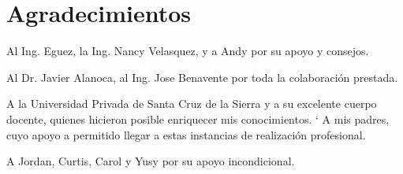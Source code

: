 \chapter*{Agradecimientos}
\thispagestyle{empty}

\begin{center}
        \vspace{0.3cm}

Al Ing. Eguez, la Ing. Nancy Velasquez, y a Andy por su apoyo y consejos.
        \vspace{0.7cm}

Al Dr. Javier Alanoca, al Ing. Jose Benavente por toda la colaboración prestada.
        \vspace{0.7cm}

A la Universidad Privada de Santa Cruz de la Sierra y a su excelente cuerpo
docente, quienes hicieron posible enriquecer mis conocimientos.
        \vspace{0.7cm}
`
A mis padres, cuyo apoyo a permitido llegar a estas instancias de realización
profesional.
        \vspace{0.7cm}

A Jordan, Curtis, Carol y Yusy por su apoyo incondicional.

\end{center}

\pagebreak